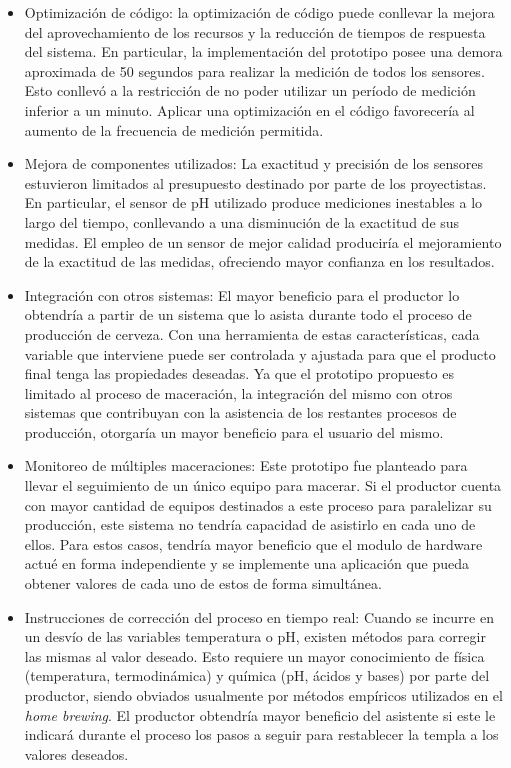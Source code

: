\begin{itemize}
    \item Optimización de código: la optimización de código puede conllevar la mejora del aprovechamiento de los recursos y la reducción de tiempos de respuesta del sistema. En particular, la implementación del prototipo posee una demora aproximada de 50 segundos para realizar la medición de todos los sensores. Esto conllevó a la restricción de no poder utilizar un período de medición inferior a un minuto. Aplicar una optimización en el código favorecería al aumento de la frecuencia de medición permitida.
    
    \item Mejora de componentes utilizados: La exactitud y precisión de los sensores estuvieron limitados al presupuesto destinado por parte de los proyectistas. En particular, el sensor de pH utilizado produce mediciones inestables a lo largo del tiempo, conllevando a una disminución de la exactitud de sus medidas. El empleo de un sensor de mejor calidad produciría el mejoramiento de la exactitud de las medidas, ofreciendo mayor confianza en los resultados.
    
    \item Integración con otros sistemas: El mayor beneficio para el productor lo obtendría a partir de un sistema que lo asista durante todo el proceso de producción de cerveza. Con una herramienta de estas características, cada variable que interviene puede ser controlada y ajustada para que el producto final tenga las propiedades deseadas. Ya que el prototipo propuesto es limitado al proceso de maceración, la integración del mismo con otros sistemas que contribuyan con la asistencia de los restantes procesos de producción, otorgaría un mayor beneficio para el usuario del mismo.
    
    \item Monitoreo de múltiples maceraciones: Este prototipo fue planteado para llevar el seguimiento de un único equipo para macerar. Si el productor cuenta con mayor cantidad de equipos destinados a este proceso para paralelizar su producción, este sistema no tendría capacidad de asistirlo en cada uno de ellos. Para estos casos, tendría mayor beneficio que el modulo de hardware actué en forma independiente y se implemente una aplicación que pueda obtener valores de cada uno de estos de forma simultánea.
    
    \item Instrucciones de corrección del proceso en tiempo real: Cuando se incurre en un desvío de las variables temperatura o pH, existen métodos para corregir las mismas al valor deseado. Esto requiere un mayor conocimiento de física (temperatura, termodinámica) y química (pH, ácidos y bases) por parte del productor, siendo obviados usualmente por métodos empíricos utilizados en el \textit{home brewing}. El productor obtendría mayor beneficio del asistente si este le indicará durante el proceso los pasos a seguir para restablecer la templa a los valores deseados.
    

\end{itemize}
